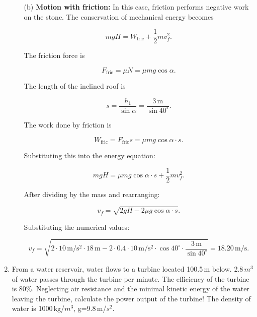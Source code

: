 \documentclass[t,aspectratio=169]{beamer}
\begin{document}
\begin{frame}
\begin{enumerate}
\begin{enumerate}
\item[(b)] \textbf{Motion with friction:} In this case, friction performs negative work on the stone. The conservation of mechanical energy becomes

$$m g H = W_{\mathrm{fric}} + \frac{1}{2} m v_f^2.$$

The friction force is

$$F_{\mathrm{fric}} = \mu N = \mu m g \cos\alpha.$$

\pagebreak
The length of the inclined roof is

$$s = \frac{h_1}{\sin\alpha} = \frac{3\,\mathrm{m}}{\sin 40^\circ}.$$

The work done by friction is

$$W_{\mathrm{fric}} = F_{\mathrm{fric}} s = \mu m g \cos\alpha \cdot s.$$

Substituting this into the energy equation:

$$m g H = \mu m g \cos\alpha \cdot s + \frac{1}{2} m v_f^2.$$

After dividing by the mass and rearranging:

$$v_f = \sqrt{2 g H - 2 \mu g \cos\alpha \cdot s}.$$

\pagebreak
Substituting the numerical values:

$$v_f = \sqrt{2 \cdot 10\,\mathrm{m/s^2} \cdot 18\,\mathrm{m} - 2 \cdot 0.4 \cdot 10\,\mathrm{m/s^2} \cdot \cos 40^\circ \cdot \frac{3\,\mathrm{m}}{\sin 40^\circ}}= 18.20\,\mathrm{m/s}.$$

\end{enumerate}
 
\pagebreak
\item From a water reservoir, water flows to a turbine located 100.5\,m below. 2.8\,$m^3$ of water passes through the turbine per minute. The efficiency of the turbine is 80\%. Neglecting air resistance and the minimal kinetic energy of the water leaving the turbine, calculate the power output of the turbine! The density of water is 1000\,kg/$m^3$, g=9.8\,m/$s^2$.

\begin{center}
\end{center}
\end{enumerate}
\end{frame}
\end{document}
